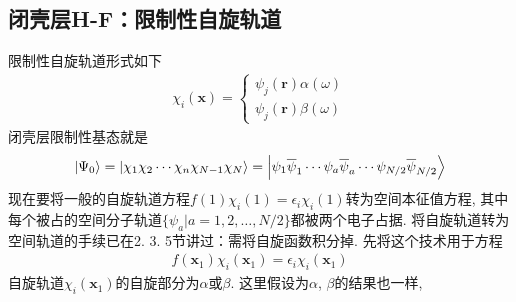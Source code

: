 \subsection{闭壳层H-F：限制性自旋轨道}
限制性自旋轨道形式如下
\begin{align}
	\chi_i(\mathbf{x}) =
	\begin{cases*}
		\psi_j(\mathbf{r})\alpha(\omega)\\
		\psi_j(\mathbf{r})\beta(\omega)
	\end{cases*}
\end{align}
闭壳层限制性基态就是
\begin{align}
	\Ket{\Psi_0} = \Ket{\chi_1\chi_2\cdots\chi_n\chi_{N-1}\chi_N} = \Ket{\psi_1\overline{\psi}_1\cdots\psi_a\overline{\psi}_a\cdots\psi_{N/2}\overline{\psi}_{N/2}}
\end{align}
现在要将一般的自旋轨道\hft 方程$f(1)\chi_i(1)=\epsilon_i\chi_i(1)$转为空间本征值方程, 
其中每个被占的空间分子轨道$\{\psi_a|a=1,2,\ldots,N/2\}$都被两个电子占据. 
将自旋轨道转为空间轨道的手续已在2.
3.
5节讲过：需将自旋函数积分掉. 
先将这个技术用于\hft 方程
\begin{align}
	f(\mathbf{x}_1)\chi_i(\mathbf{x}_1) = \epsilon_i\chi_i(\mathbf{x}_1)
\end{align}
自旋轨道$\chi_i(\mathbf{x}_1)$的自旋部分为$\alpha$或$\beta$. 
这里假设为$\alpha$, 
$\beta$的结果也一样,

